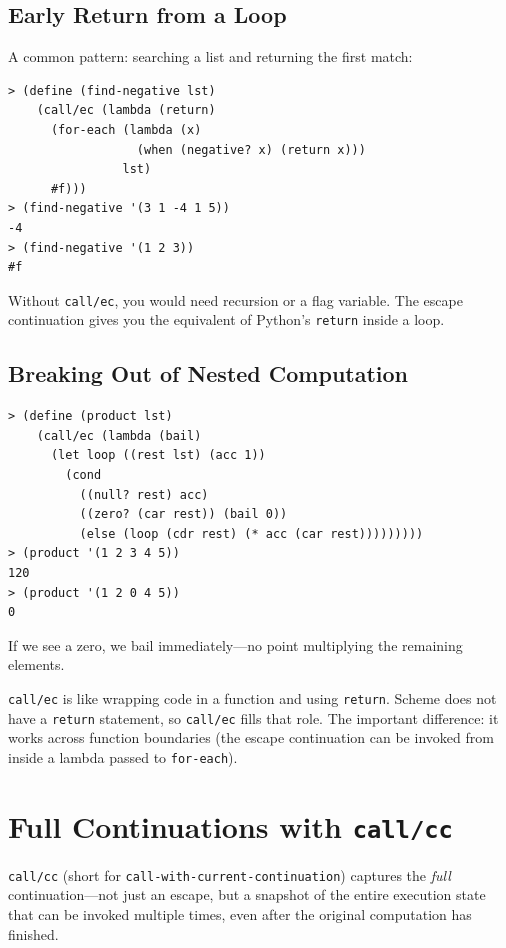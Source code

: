 \subsection{Early Return from a Loop}

A common pattern: searching a list and returning the first match:

\begin{lstlisting}[style=repl]
> (define (find-negative lst)
    (call/ec (lambda (return)
      (for-each (lambda (x)
                  (when (negative? x) (return x)))
                lst)
      #f)))
> (find-negative '(3 1 -4 1 5))
-4
> (find-negative '(1 2 3))
#f
\end{lstlisting}

Without \texttt{call/ec}, you would need recursion or a flag variable. The escape continuation gives you the equivalent of Python's \texttt{return} inside a loop.

\subsection{Breaking Out of Nested Computation}

\begin{lstlisting}[style=repl]
> (define (product lst)
    (call/ec (lambda (bail)
      (let loop ((rest lst) (acc 1))
        (cond
          ((null? rest) acc)
          ((zero? (car rest)) (bail 0))
          (else (loop (cdr rest) (* acc (car rest)))))))))
> (product '(1 2 3 4 5))
120
> (product '(1 2 0 4 5))
0
\end{lstlisting}

If we see a zero, we bail immediately---no point multiplying the remaining elements.

\begin{note}
\texttt{call/ec} is like wrapping code in a function and using \texttt{return}. Scheme does not have a \texttt{return} statement, so \texttt{call/ec} fills that role. The important difference: it works across function boundaries (the escape continuation can be invoked from inside a lambda passed to \texttt{for-each}).
\end{note}

\section{Full Continuations with \texttt{call/cc}}

\texttt{call/cc} (short for \texttt{call-with-current-continuation}) captures the \emph{full} continuation---not just an escape, but a snapshot of the entire execution state that can be invoked multiple times, even after the original computation has finished.

